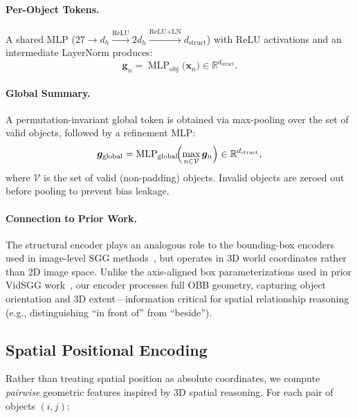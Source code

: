 \documentclass[runningheads]{llncs}
\newcommand{\mR}{\mathbb{R}}
\newcommand{\op}[1]{\operatorname{#1}}
\newcommand{\mat}[1]{\bm{#1}}
\begin{document}
\paragraph{Per-Object Tokens.}  A shared MLP ($27 \!\to\! d_h \xrightarrow{\text{ReLU}} 2d_h \xrightarrow{\text{ReLU+LN}} d_{\text{struct}}$) with ReLU activations and an intermediate LayerNorm produces:
\begin{equation}
    \mat{g}_n = \op{MLP}_{\text{obj}}\bigl(\mat{x}_n\bigr) \in \mR^{d_{\text{struct}}}.
    \label{eq:gse_obj}
\end{equation}

\paragraph{Global Summary.}  A permutation-invariant global token is obtained via max-pooling over the set of valid objects, followed by a refinement MLP:
\begin{equation}
    \mat{g}_{\text{global}} = \op{MLP}_{\text{global}}\!\Bigl(\max_{n \in \mathcal{V}} \mat{g}_n\Bigr) \in \mR^{d_{\text{struct}}},
    \label{eq:gse_global}
\end{equation}
where $\mathcal{V}$ is the set of valid (non-padding) objects.  Invalid objects are zeroed out before pooling to prevent bias leakage.

\paragraph{Connection to Prior Work.}  The structural encoder plays an analogous role to the bounding-box encoders used in image-level SGG methods~\cite{xu2017scene,li2017scene}, but operates in 3D world coordinates rather than 2D image space.  Unlike the axis-aligned box parameterizations used in prior VidSGG work~\cite{cong2021spatial,chen2019action}, our encoder processes full OBB geometry, capturing object orientation and 3D extent---information critical for spatial relationship reasoning (e.g., distinguishing ``in front of'' from ``beside'').


\subsection{Spatial Positional Encoding}
\label{sec:spe}

Rather than treating spatial position as absolute coordinates, we compute \emph{pairwise} geometric features inspired by 3D spatial reasoning.  For each pair of objects $(i, j)$:
\end{document}
